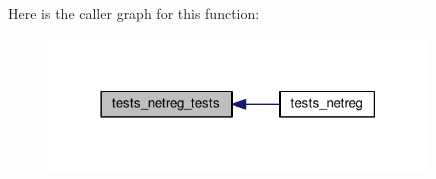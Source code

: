 Here is the caller graph for this function\+:
\nopagebreak
\begin{figure}[H]
\begin{center}
\leavevmode
\includegraphics[width=285pt]{tests-netreg_8c_a4e14a773dca6ee6d1ec1cd379c69fefd_icgraph}
\end{center}
\end{figure}
